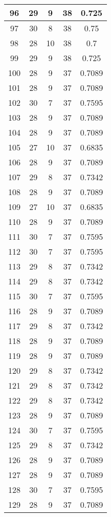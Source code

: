 \documentclass[letterpaper, 12pt]{article}
\begin{document}
\begin{longtable}{|c|c|c|c|c|}
\hline
96 & 29 & 9 & 38 & 0.725 \\
\hline
97 & 30 & 8 & 38 & 0.75 \\
\hline
98 & 28 & 10 & 38 & 0.7 \\
\hline
99 & 29 & 9 & 38 & 0.725 \\
\hline
100 & 28 & 9 & 37 & 0.7089 \\
\hline
101 & 28 & 9 & 37 & 0.7089 \\
\hline
102 & 30 & 7 & 37 & 0.7595 \\
\hline
103 & 28 & 9 & 37 & 0.7089 \\
\hline
104 & 28 & 9 & 37 & 0.7089 \\
\hline
105 & 27 & 10 & 37 & 0.6835 \\
\hline
106 & 28 & 9 & 37 & 0.7089 \\
\hline
107 & 29 & 8 & 37 & 0.7342 \\
\hline
108 & 28 & 9 & 37 & 0.7089 \\
\hline
109 & 27 & 10 & 37 & 0.6835 \\
\hline
110 & 28 & 9 & 37 & 0.7089 \\
\hline
111 & 30 & 7 & 37 & 0.7595 \\
\hline
112 & 30 & 7 & 37 & 0.7595 \\
\hline
113 & 29 & 8 & 37 & 0.7342 \\
\hline
114 & 29 & 8 & 37 & 0.7342 \\
\hline
115 & 30 & 7 & 37 & 0.7595 \\
\hline
116 & 28 & 9 & 37 & 0.7089 \\
\hline
117 & 29 & 8 & 37 & 0.7342 \\
\hline
118 & 28 & 9 & 37 & 0.7089 \\
\hline
119 & 28 & 9 & 37 & 0.7089 \\
\hline
120 & 29 & 8 & 37 & 0.7342 \\
\hline
121 & 29 & 8 & 37 & 0.7342 \\
\hline
122 & 29 & 8 & 37 & 0.7342 \\
\hline
123 & 28 & 9 & 37 & 0.7089 \\
\hline
124 & 30 & 7 & 37 & 0.7595 \\
\hline
125 & 29 & 8 & 37 & 0.7342 \\
\hline
126 & 28 & 9 & 37 & 0.7089 \\
\hline
127 & 28 & 9 & 37 & 0.7089 \\
\hline
128 & 30 & 7 & 37 & 0.7595 \\
\hline
129 & 28 & 9 & 37 & 0.7089 \\

\end{longtable}
\end{document}
